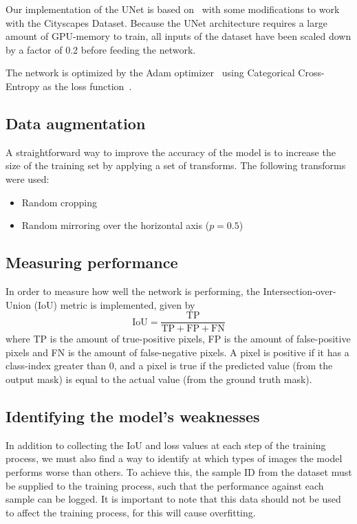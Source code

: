 Our implementation of the UNet is based on~\cite{GH-Pytorch-UNet2018} with some modifications to work with the Cityscapes Dataset. Because the UNet architecture requires a large amount of GPU-memory to train, all inputs of the dataset have been scaled down by a factor of 0.2 before feeding the network.

The network is optimized by the Adam optimizer~\cite{Kingma2015AdamAM} using Categorical Cross-Entropy as the loss function~\cite{10.1145/1102351.1102422}.

\subsection{Data augmentation}
\label{subsec:data-augmentation}

A straightforward way to improve the accuracy of the model is to increase the size of the training set by applying a set of transforms. 
The following transforms were used:
\begin{itemize}
    \item Random cropping 
    \item Random mirroring over the horizontal axis ($p=0.5$)
\end{itemize}

\subsection{Measuring performance}
In order to measure how well the network is performing, the Intersection-over-Union (IoU) metric is implemented, given by
\begin{equation}
    \mathrm{IoU} = \frac{\mathrm{TP}}{\mathrm{TP}+\mathrm{FP}+\mathrm{FN}}
\end{equation}
where TP is the amount of true-positive pixels, FP is the amount of false-positive pixels and FN is the amount of false-negative pixels. A pixel is positive if it has a class-index greater than 0, and a pixel is true if the predicted value (from the output mask) is equal to the actual value (from the ground truth mask).

\subsection{Identifying the model's weaknesses}
In addition to collecting the IoU and loss values at each step of the training process, we must also find a way to identify at which types of images the model performs worse than others. To achieve this, the sample ID from the dataset must be supplied to the training process, such that the performance against each sample can be logged. It is important to note that this data should not be used to affect the training process, for this will cause overfitting.

